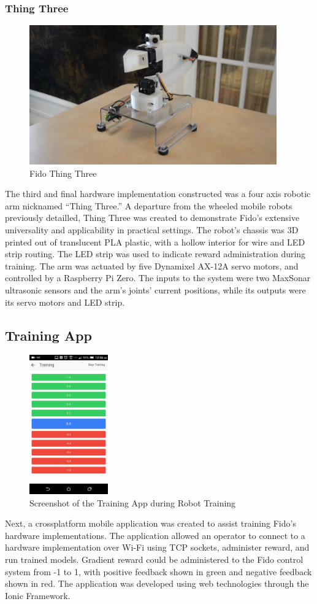 \subsubsection{Thing Three}
\begin{figure}
	\centering
	\includegraphics[height=6cm]{Figures/ThingThree.png}
	\caption{Fido Thing Three}
\end{figure}

The third and final hardware implementation constructed was a four axis robotic arm nicknamed ``Thing Three.''
A departure from the wheeled mobile robots previously detailled, Thing Three was created to demonstrate Fido's extensive universality and applicability in practical settings.
The robot's chassis was 3D printed out of translucent PLA plastic, with a hollow interior for wire and LED strip routing.
The LED strip was used to indicate reward administration during training.
The arm was actuated by five Dynamixel AX-12A servo motors, and controlled by a Raspberry Pi Zero.
The inputs to the system were two MaxSonar ultrasonic sensors and the arm's joints' current positions, while its outputs were its servo motors and LED strip.

\subsection{Training App}

\begin{figure}
	\centering
	\includegraphics[height=6cm]{Figures/IonicScreenshot.png}
	\caption{Screenshot of the Training App during Robot Training}
\end{figure}

Next, a crossplatform mobile application was created to assist training Fido's hardware implementations.
The application allowed an operator to connect to a hardware implementation over Wi-Fi using TCP sockets, administer reward, and run trained models.
Gradient reward could be administered to the Fido control system from -1 to 1, with positive feedback shown in green and negative feedback shown in red.
The application was developed using web technologies through the Ionic Framework.
